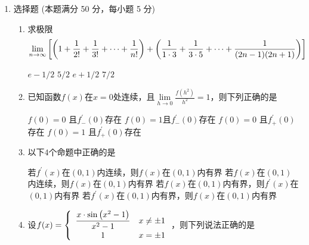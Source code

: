 
\begin{enumerate}
	\item
选择题 (本题满分 50 分，每小题 5 分)
\begin{enumerate}
	\item
求极限 
\[
\lim \limits_{n \rightarrow \infty}\left[\left(1+\dfrac{\mathstrut 1}{\mathstrut 2!}+\dfrac{1}{3 !}+\dots+\dfrac{1}{n!}\right)+\left(\dfrac{1}{1\cdot3}+\dfrac{1}{3 \cdot 5}+\dots+\dfrac{1}{(2 n-1)(2 n+1)}\right)\right]
\]


\fourchoices
{$ e-1/2 $}
{$ 5/2 $}
{$ e+1/2 $}
{$ 7/2 $}




\item 
已知函数$ f(x) $在$ x=0 $处连续，且$\lim\limits _{h \rightarrow 0} \frac{f\left(h^{2}\right)}{h^{2}}=1$，则下列正确的是  


\fourchoices
{$ f(0)=0 $ 且$ f_- ^{\prime} (0) $存在}
{$ f(0)=1 $且$ f_- ^{\prime} (0) $存在}
{$ f(0)=0 $ 且$ f_+ ^{\prime} (0) $存在}
{$ f(0)=1 $ 且$ f_+ ^{\prime} (0) $存在}


\item 
以下$ 4 $个命题中正确的是  


\fourchoices
{若$ f ^{\prime} (x) $在$ (0,1) $内连续，则$ f(x) $在$ (0,1) $内有界}
{若$ f(x) $在$ (0,1) $内连续，则$ f(x) $在$ (0,1) $内有界}
{若$ f(x) $在$ (0,1) $内有界，则$ f ^{\prime} (x) $在$ (0,1) $内有界}
{若$ f ^{\prime} (x) $在$ (0,1) $内有界，则$ f(x) $在$ (0,1) $内有界}



\item 
设$ f(x)=\left\{\begin{array}{cl}{\dfrac{\mathstrut x \cdot \sin \left(x^{2}-1\right)}{\mathstrut x^{2}-1}} & {x \neq \pm 1} \\ \mathstrut {1} & {x=\pm 1}\end{array}\right. $，则下列说法正确的是 



\end{enumerate}
\end{enumerate}

